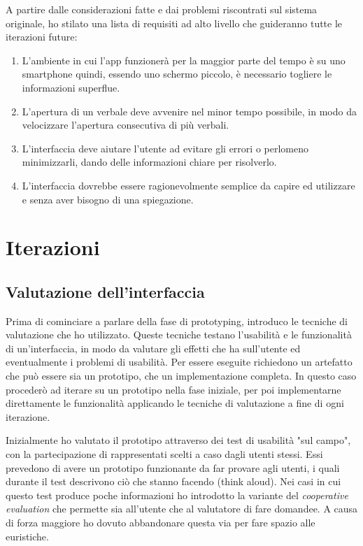 \documentclass[Lau, oneside, noexaminfo]{sapthesis}%
\begin{document}
A partire dalle considerazioni fatte e dai problemi riscontrati sul sistema originale, ho stilato una lista di requisiti ad alto livello che guideranno tutte le iterazioni future:
\begin{enumerate}
	\item L'ambiente in cui l'app funzionerà per la maggior parte del tempo è su uno smartphone quindi, essendo uno schermo piccolo, è necessario togliere le informazioni superflue.
	\item L'apertura di un verbale deve avvenire nel minor tempo possibile, in modo da velocizzare l'apertura consecutiva di più verbali.
	\item L'interfaccia deve aiutare l'utente ad evitare gli errori o perlomeno minimizzarli, dando delle informazioni chiare per risolverlo.
	\item L'interfaccia dovrebbe essere ragionevolmente semplice da capire ed utilizzare e senza aver bisogno di una spiegazione.
\end{enumerate}

\section{Iterazioni}
\subsection{Valutazione dell'interfaccia}
\label{heuristics}
Prima di cominciare a parlare della fase di prototyping, introduco le tecniche di valutazione che ho utilizzato. Queste tecniche testano l'usabilità e le funzionalità di un'interfaccia, in modo da valutare gli effetti che ha sull'utente ed eventualmente i problemi di usabilità. Per essere eseguite richiedono un artefatto che può essere sia un prototipo, che un implementazione completa. In questo caso procederò ad iterare su un prototipo nella fase iniziale, per poi implementarne direttamente le funzionalità applicando le tecniche di valutazione a fine di ogni iterazione.

Inizialmente ho valutato il prototipo attraverso dei test di usabilità "sul campo", con la partecipazione di rappresentati scelti a caso dagli utenti stessi. Essi prevedono di avere un prototipo funzionante da far provare agli utenti, i quali durante il test descrivono ciò che stanno facendo (think aloud). Nei casi in cui questo test produce poche informazioni ho introdotto la variante del \textit{cooperative evaluation} che permette sia all'utente che al valutatore di fare domandee. A causa di forza maggiore ho dovuto abbandonare questa via per fare spazio alle euristiche.
\end{document}
